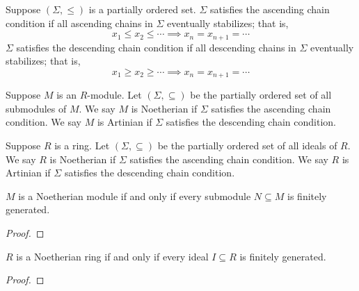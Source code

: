 \begin{definition}
    Suppose \((\Sigma,\leq)\) is a partially ordered set.
    \(\Sigma\) satisfies the ascending chain condition
    if all ascending chains in \(\Sigma\) eventually stabilizes; that is,
    \begin{equation*}
        x_1 \leq x_2 \leq \cdots \implies x_n = x_{n+1} = \cdots
    \end{equation*}
    \(\Sigma\) satisfies the descending chain condition
    if all descending chains in \(\Sigma\) eventually stabilizes; that is,
    \begin{equation*}
        x_1 \geq x_2 \geq \cdots \implies x_n = x_{n+1} = \cdots
    \end{equation*}
\end{definition}
\begin{definition}
    Suppose \(M\) is an \(R\)-module.
    Let \((\Sigma, \subseteq)\) be the partially ordered set of all submodules of \(M\).
    We say \(M\) is Noetherian if \(\Sigma\) satisfies the ascending chain condition.
    We say \(M\) is Artinian if \(\Sigma\) satisfies the descending chain condition.
\end{definition}
\begin{definition}
    Suppose \(R\) is a ring.
    Let \((\Sigma, \subseteq)\) be the partially ordered set of all ideals of \(R\).
    We say \(R\) is Noetherian if \(\Sigma\) satisfies the ascending chain condition.
    We say \(R\) is Artinian if \(\Sigma\) satisfies the descending chain condition.
\end{definition}

\begin{theorem}
    \(M\) is a Noetherian module if and only if every submodule \(N \subseteq M\) is finitely generated.
\end{theorem}
\begin{proof}
    
\end{proof}
\begin{corollary}\label{cor:noetherian-generated}
    \(R\) is a Noetherian ring if and only if every ideal \(I \subseteq R\) is finitely generated.
\end{corollary}
\begin{proof}
    
\end{proof}

